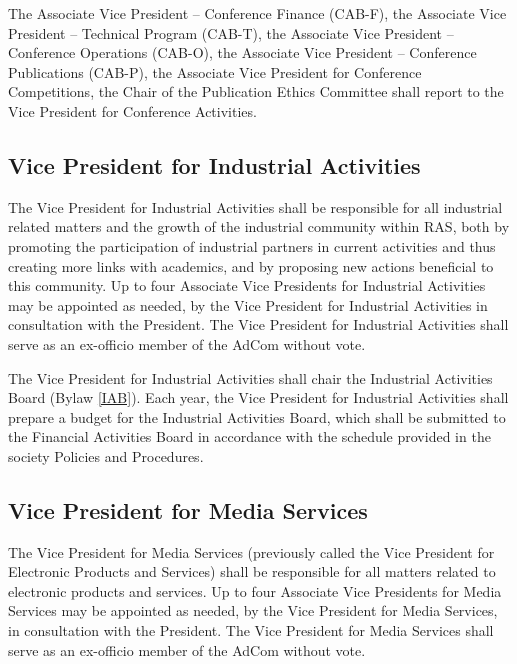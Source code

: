 \documentclass[10pt]{article}
\newcommand{\blref}[1]{Bylaw \ref{#1}}
\begin{document}
The Associate Vice President – Conference Finance (CAB-F), the Associate Vice President – Technical Program (CAB-T), the Associate Vice President – Conference Operations (CAB-O), the Associate Vice President – Conference Publications (CAB-P), the Associate Vice President for Conference Competitions, the Chair of the Publication Ethics Committee shall report to the Vice President for Conference Activities.



\subsection{Vice President for Industrial Activities}

The Vice President for Industrial Activities shall be responsible for all industrial related matters and the growth of the industrial community within RAS, both by promoting the participation of industrial partners in current activities and thus creating more links with academics, and by proposing new actions beneficial to this community. Up to four Associate Vice Presidents for Industrial Activities may be appointed as needed, by the Vice President for Industrial Activities in consultation with the President. The Vice President for Industrial Activities shall serve as an ex-officio member of the AdCom without vote.

The Vice President for Industrial Activities shall chair the Industrial Activities Board (\blref{IAB}). Each year, the Vice President for Industrial Activities shall prepare a budget for the Industrial Activities Board, which shall be submitted to the Financial Activities Board in accordance with the schedule provided in the society Policies and Procedures.



\subsection{Vice President for Media Services}

The Vice President for Media Services (previously called the Vice President for Electronic Products and Services) shall be responsible for all matters related to electronic products and services. Up to four Associate Vice Presidents for Media Services may be appointed as needed, by the Vice President for Media Services, in consultation with the President. The Vice President for Media Services shall serve as an ex-officio member of the AdCom without vote.
\end{document}
